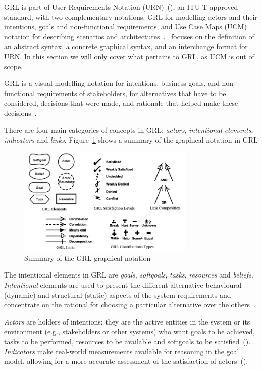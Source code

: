 \documentclass[dissertation,final]{softeng}
\begin{document}
GRL is part of User Requirements Notation (URN)~(), an ITU-T approved standard, with two complementary notations: GRL for modelling actors and their intentions, goals and non-functional requirements, and Use Case Maps (UCM) notation for describing scenarios and architectures~\citep{Amyot2003}.~ focuses on the definition of an abstract syntax, a concrete graphical syntax, and an interchange format for URN. In this section we will only cover what pertains to GRL, as UCM is out of scope. 

GRL is a visual modelling notation for intentions, business goals, and non-functional requirements of stakeholders, for alternatives that have to be considered, decisions that were made, and rationale that helped make these decisions~\citep{amyot2011user}.

There are four main categories of concepts in GRL: \emph{actors}, \emph{intentional elements}, \emph{indicators} and \emph{links}. Figure~\ref{fig:grl_visualsyntax} shows a summary of the graphical notation in GRL

\begin{figure}[h]
\includegraphics[width=0.75\textwidth]{grl_visualsyntax}
\centering
\caption[Summary of the GRL graphical notation]{Summary of the GRL graphical notation~\citep{Roy:2007wyba}}
\label{fig:grl_visualsyntax}
\end{figure}

The intentional elements in GRL are \emph{goals}, \emph{softgoals}, \emph{tasks}, \emph{resources} and \emph{beliefs}. \emph{Intentional} elements are used to present the different alternative behavioural (dynamic) and structural (static) aspects of the system requirements and concentrate on the rational for choosing a particular alternative over the others~\citep{Saleh2004}.

\emph{Actors} are holders of intentions; they are the active entities in the system or its environment (e.g., stakeholders or other systems) who want goals to be achieved, tasks to be performed, resources to be available and softgoals to be satisfied~(). \emph{Indicators} make real-world measurements available for reasoning in the goal model, allowing for a more accurate assessment of the satisfaction of actors~(). 
\end{document}
